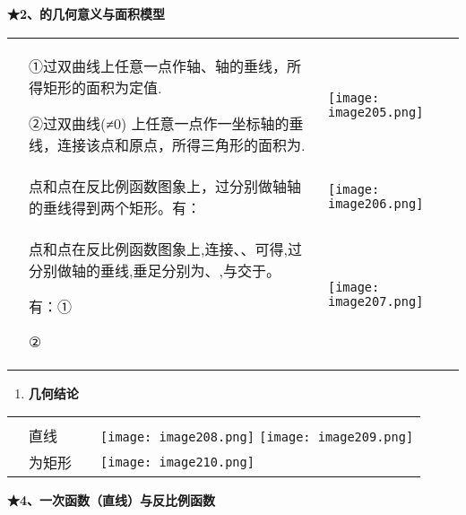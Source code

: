 \textbf{★2、的几何意义与面积模型}

\begin{longtable}[]{@{}lll@{}}
\toprule
\endhead
\begin{minipage}[t]{0.30\columnwidth}\raggedright
\strut
\end{minipage} & \begin{minipage}[t]{0.30\columnwidth}\raggedright
①过双曲线上任意一点作轴、轴的垂线，所得矩形的面积为定值.

②过双曲线(≠0)
上任意一点作一坐标轴的垂线，连接该点和原点，所得三角形的面积为.\strut
\end{minipage} & \begin{minipage}[t]{0.30\columnwidth}\raggedright
\texttt{[image: image205.png]}\strut
\end{minipage}\tabularnewline
& 点和点在反比例函数图象上，过分别做轴轴的垂线得到两个矩形。有： &
\texttt{[image: image206.png]}\tabularnewline
\begin{minipage}[t]{0.30\columnwidth}\raggedright
\strut
\end{minipage} & \begin{minipage}[t]{0.30\columnwidth}\raggedright
点和点在反比例函数图象上,连接、、可得,过分别做轴的垂线,垂足分别为、,与交于。

有：①

②\strut
\end{minipage} & \begin{minipage}[t]{0.30\columnwidth}\raggedright
\texttt{[image: image207.png]}\strut
\end{minipage}\tabularnewline
\bottomrule
\end{longtable}

\begin{enumerate}
\def\labelenumi{\arabic{enumi}.}
\setcounter{enumi}{2}
\item
  \textbf{几何结论}
\end{enumerate}

\begin{longtable}[]{@{}llll@{}}
\toprule
\endhead
& & &\tabularnewline
& 直线 & &
\texttt{[image: image208.png]}
\texttt{[image: image209.png]}\tabularnewline
& 为矩形 & &
\texttt{[image: image210.png]}\tabularnewline
\bottomrule
\end{longtable}

\textbf{★4、一次函数（直线）与反比例函数}

